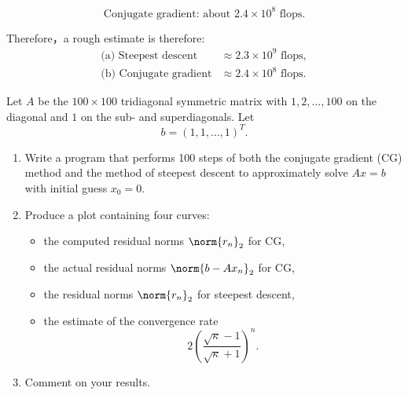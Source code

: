 \documentclass{ctexart}
\begin{document}
\begin{solution}
\begin{enumerate}[label=(\alph*)]
        \[
          \boxed{\text{Conjugate gradient: about } 2.4\times 10^8 \text{ flops}.}
        \]
    \end{enumerate}

    Therefore，a rough estimate is therefore:
    \[
      \boxed{
        \begin{aligned}
          \text{(a) Steepest descent} &\approx 2.3\times 10^9 \text{ flops},\\
          \text{(b) Conjugate gradient} &\approx 2.4\times 10^8 \text{ flops}.
      \end{aligned}}
    \]
  \end{solution}
  \begin{problem}\label{pro:12}
    Let $A$ be the $100 \times 100$ tridiagonal symmetric matrix with
    $1, 2, \ldots, 100$ on the diagonal and $1$ on the sub- and superdiagonals.
    Let
    \[
      b = (1,1,\ldots,1)^T.
    \]

    \begin{enumerate}[label=(\alph*)]
      \item Write a program that performs 100 steps of both the conjugate gradient (CG) method
        and the method of steepest descent to approximately solve $Ax = b$ with initial guess $x_0 = 0$.

      \item Produce a plot containing four curves:
        \begin{itemize}
          \item the computed residual norms $\norm{r_n}_2$ for CG,
          \item the actual residual norms $\norm{b - A x_n}_2$ for CG,
          \item the residual norms $\norm{r_n}_2$ for steepest descent,
          \item the estimate of the convergence rate
            \[
              2\left(\frac{\sqrt{\kappa}-1}{\sqrt{\kappa}+1}\right)^n.
            \]
        \end{itemize}

      \item Comment on your results.
    \end{enumerate}
  \end{problem}
\end{document}
